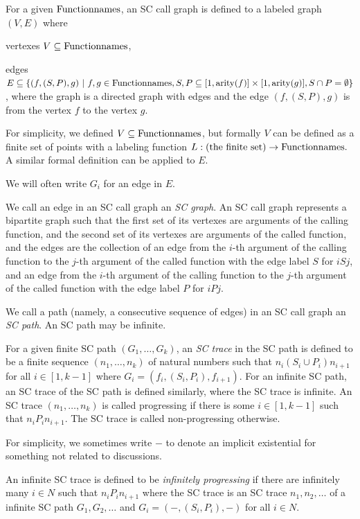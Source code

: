\begin{Def}\rm
For a given ${\rm Functionnames}$,
an SC call graph is defined to a labeled graph $(V,E)$ where

vertexes $V \subseteq {\rm Functionnames}$,

edges $E \subseteq \{(f, (S, P), g) \ |\ 
f,g \in \Functionnames,
S, P \subseteq [1,\arity(f)] \times [1,\arity(g)],
S \cap P = \emptyset \}$,
where the graph is a directed graph with edges and
the edge $(f, (S, P), g)$ is from the vertex $f$ to the vertex $g$.

For simplicity, we defined $V \subseteq {\rm Functionnames}$, but
formally $V$ 
can be defined as a finite set of points
with a labeling function
$
L : \hbox{(the finite set)} \to {\rm Functionnames}.
$
A similar formal definition can be applied to $E$.

We will often write $G_i$ for an edge in $E$.
%

We call an edge in an SC call graph an {\em SC graph}.
An SC call graph represents a bipartite graph such that
the first set of its vertexes are arguments of the calling function, and
the second set of its vertexes are arguments of the called function, and
the edges are the collection of
an edge from the $i$-th argument of the calling function to
the $j$-th argument of the called function with the edge label $S$
for $i S j$,
and
an edge from the $i$-th argument of the calling function to
the $j$-th argument of the called function with the edge label $P$
for $i P j$.

We call a path (namely, a consecutive sequence of edges) in an SC call graph an {\em SC path}. An SC path may be infinite.

%
For a given finite SC path $(G_1,\ldots,G_k)$,
an {\em SC trace} in the SC path is defined to be
a finite sequence $(n_1,\ldots,n_k)$ of natural numbers such that
$n_i (S_i \cup P_i) n_{i+1}$ for all $i \in [1,k-1]$
where $G_i = (f_i,(S_i,P_i),f_{i+1})$.
For an infinite SC path,
an SC trace of the SC path is defined similarly,
where the SC trace is infinite.
%
An SC trace $(n_1,\ldots,n_k)$ is called progressing
if there is some $i \in [1,k-1]$ such that
$n_i P_i n_{i+1}$.
The SC trace is called non-progressing otherwise.
\end{Def}

For simplicity, we sometimes write $-$ to denote
an implicit existential for
something not related to discussions.

\begin{Def}\rm
An infinite SC trace is defined to be {\em infinitely progressing}
if there are infinitely many $i \in N$ such that $n_i P_i n_{i+1}$
where
the SC trace is an SC trace $n_1,n_2,\ldots$ of 
a infinite SC path $G_1,G_2,\dots$
and $G_i=(-,(S_i,P_i),-)$ for all $i \in N$.
\end{Def}


